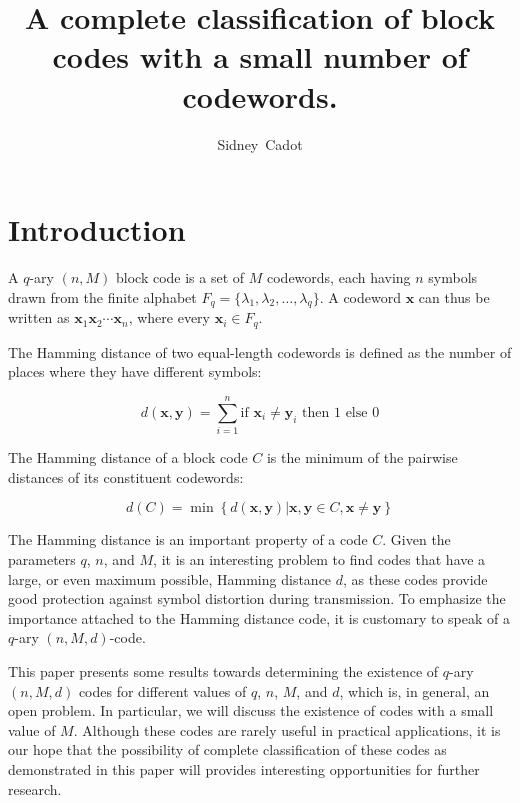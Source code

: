 \documentclass[a4paper]{article}
\author{Sidney~Cadot}
\title{A complete classification of block codes with a small number of codewords.}
\date{}
\begin{document}
\maketitle

\section{Introduction}

A $q$-ary $(n,M)$ block code is a set of $M$ codewords, each having $n$ symbols drawn from the finite alphabet $F_q = \{\lambda_1, \lambda_2, \ldots, \lambda_q\}$.
A codeword $\mathbf{x}$ can thus be written as $\mathbf{x}_1 \mathbf{x}_2 \cdots \mathbf{x}_n$, where every $\mathbf{x}_i \in F_q$.

The Hamming distance of two equal-length codewords is defined as the number of places where they have different symbols:

\begin{equation}
d(\mathbf{x},\mathbf{y})=\sum_{i=1}^{n} \mbox{if $\mathbf{x}_i \neq \mathbf{y}_i$ then $1$ else $0$}
\label{eq:hamming-words}
\end{equation}

The Hamming distance of a block code $C$ is the minimum of the pairwise distances of its constituent codewords:

\begin{equation}
d(C)=\min \left\{ d(\mathbf{x},\mathbf{y}) | \mathbf{x},\mathbf{y} \in C, \mathbf{x} \neq \mathbf{y} \right\}
\label{eq:hamming-code}
\end{equation}

The Hamming distance is an important property of a code $C$. Given the parameters $q$, $n$, and $M$, it is an interesting problem to find codes
that have a large, or even maximum possible, Hamming distance $d$, as these codes provide good protection against symbol distortion during
transmission. To emphasize the importance attached to the Hamming distance code, it is customary to speak of a $q$-ary $(n,M,d)$-code.

This paper presents some results towards determining the existence of $q$-ary $(n,M,d)$ codes for different values of $q$, $n$, $M$, and $d$,
which is, in general, an open problem. In particular, we will discuss the existence of codes with a small value of $M$. Although these codes
are rarely useful in practical applications, it is our hope that the possibility of complete classification of these codes as demonstrated in this
paper will provides interesting opportunities for further research.
\end{document}
